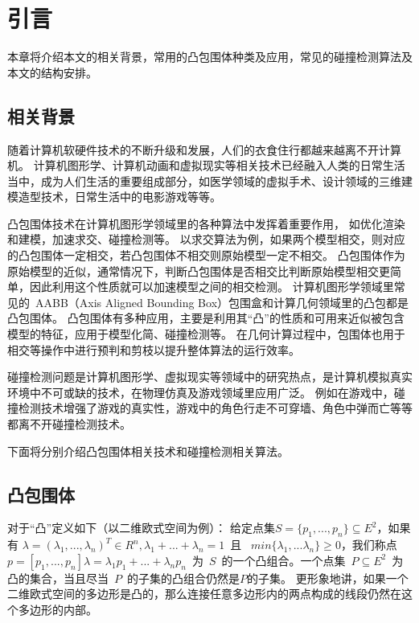 

\chapter{引言}
\label{cha:intro}

本章将介绍本文的相关背景，常用的凸包围体种类及应用，常见的碰撞检测算法及本文的结构安排。

\section{相关背景}

随着计算机软硬件技术的不断升级和发展，人们的衣食住行都越来越离不开计算机。
计算机图形学、计算机动画和虚拟现实等相关技术已经融入人类的日常生活当中，成为人们生活的重要组成部分，如医学领域的虚拟手术、设计领域的三维建模造型技术，日常生活中的电影游戏等等。

凸包围体技术在计算机图形学领域里的各种算法中发挥着重要作用，
如优化渲染和建模，加速求交、碰撞检测等。
以求交算法为例，如果两个模型相交，则对应的凸包围体一定相交，若凸包围体不相交则原始模型一定不相交。
凸包围体作为原始模型的近似，通常情况下，判断凸包围体是否相交比判断原始模型相交更简单，因此利用这个性质就可以加速模型之间的相交检测。
计算机图形学领域里常见的~AABB（Axis Aligned Bounding Box）包围盒和计算几何领域里的凸包都是凸包围体。
凸包围体有多种应用，主要是利用其“凸”的性质和可用来近似被包含模型的特征，应用于模型化简、碰撞检测等。
在几何计算过程中，包围体也用于相交等操作中进行预判和剪枝以提升整体算法的运行效率。

碰撞检测问题是计算机图形学、虚拟现实等领域中的研究热点，是计算机模拟真实环境中不可或缺的技术，在物理仿真及游戏领域里应用广泛。
例如在游戏中，碰撞检测技术增强了游戏的真实性，游戏中的角色行走不可穿墙、角色中弹而亡等等都离不开碰撞检测技术。

下面将分别介绍凸包围体相关技术和碰撞检测相关算法。

\section{凸包围体}
\label{sec:convex-bv}

对于“凸”定义如下（以二维欧式空间为例）：
给定点集$S = \{p_1, ..., p_n\} \subseteq E^2$，如果有
$\lambda = (\lambda_1,...,\lambda_n)^T \in R^n, \lambda_1 + ... + \lambda_n = 1
$~且~ $min\{\lambda_1,...\lambda_n\} \geq 0$，我们称点 $p = [p_1, ... ,
p_n]\lambda = \lambda_1 p_1 + ... + \lambda_n
p_n$~为~$S$~的一个凸组合。一个点集~$P \subseteq E^2$~为凸的集合，当且尽当~$P$~的子集的凸组合仍然是$P$的子集。
更形象地讲，如果一个二维欧式空间的多边形是凸的，那么连接任意多边形内的两点构成的线段仍然在这个多边形的内部。

